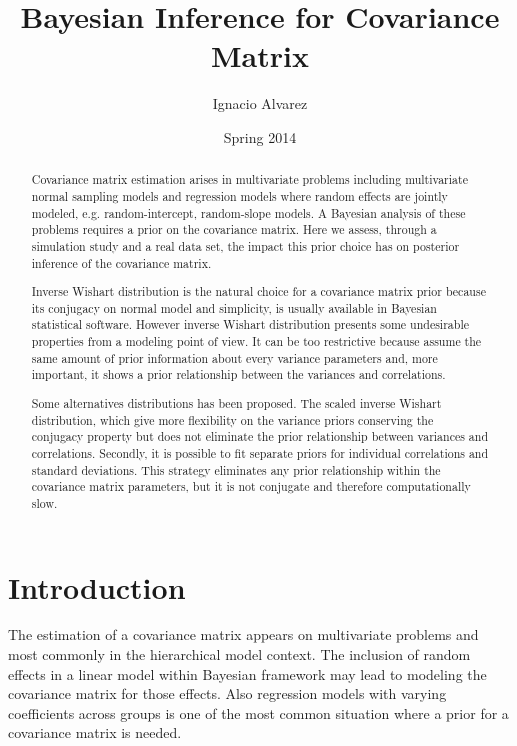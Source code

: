 \documentclass{article}
\title{Bayesian Inference for  Covariance Matrix}
\author{Ignacio Alvarez}
\date{ Spring 2014 }
\begin{document}
 
\maketitle 


\begin{abstract}
Covariance matrix estimation arises in multivariate problems including multivariate normal sampling models and regression models where random effects are jointly modeled, e.g. random-intercept, random-slope models. A Bayesian analysis of these problems requires a prior on the covariance matrix. Here we assess, through a simulation study and a real data set, the impact this prior choice has on posterior inference of the covariance matrix.

Inverse Wishart distribution is the natural choice for a covariance matrix prior because its conjugacy on normal model and simplicity, is usually available in Bayesian statistical software. However inverse Wishart distribution presents some undesirable properties from a modeling point of view. It can be too restrictive because assume the same amount of prior information about every variance parameters and, more important, it shows a prior relationship between the variances and correlations.

Some alternatives distributions has been proposed. The scaled inverse Wishart distribution, which give more flexibility on the variance priors conserving the conjugacy property but does not eliminate the prior relationship between variances and correlations. Secondly, it is possible to fit separate priors for individual correlations and standard deviations. This strategy eliminates any prior relationship within the covariance matrix parameters, but it is not conjugate and therefore computationally slow. 
\end{abstract}

\newpage 
\tableofcontents

\newpage 
{} 

\section{Introduction} 

The estimation of a covariance matrix appears on multivariate problems and most commonly in the hierarchical model context. The inclusion of random effects in a linear model within Bayesian framework may lead to modeling the covariance matrix for those effects. Also regression models with varying coefficients across groups is one of the most common situation where a prior for a covariance matrix is needed. 
\end{document}
